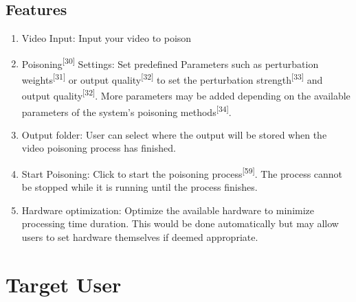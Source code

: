 \subsection{Features}
\label{subsection:features}

\begin{enumerate}[leftmargin=80pt]
    \item Video Input: Input your video to poison
    \item Poisoning\textsuperscript{[30]} Settings: Set predefined Parameters such as perturbation weights\textsuperscript{[31]} or output quality\textsuperscript{[32]} to set the perturbation strength\textsuperscript{[33]} and output quality\textsuperscript{[32]}. More parameters may be added depending on the available parameters of the system's poisoning methods\textsuperscript{[34]}.
    \item Output folder: User can select where the output will be stored when the video poisoning process has finished.
    \item Start Poisoning: Click to start the poisoning process\textsuperscript{[59]}. The process cannot be stopped while it is running until the process finishes.
    \item Hardware optimization: Optimize the available hardware to minimize processing time duration. This would be done automatically but may allow users to set hardware themselves if deemed appropriate.
\end{enumerate}

\section{Target User}
\label{section:target-user}

